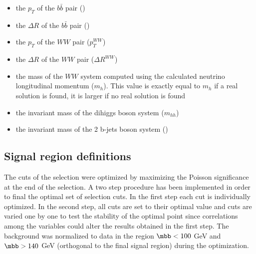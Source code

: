 \begin{itemize}
\item the $p_T$ of the $b \bar{b}$ pair (\ptbb)
\item the $\Delta R$ of the $b \bar{b}$ pair (\drbb)
\item the $p_T$ of the $WW$ pair ($p_T^{WW}$)
\item the $\Delta R$ of the $WW$ pair ($\Delta R^{WW}$)
\item the mass of the $WW$ system computed using the calculated neutrino longitudinal momentum ($m_{h}$). This value is exactly equal to $m_h$ if a real solution is found, it is larger if no real solution is found
\item the invariant mass of the dihiggs boson system ($m_{hh}$) 
\item the invariant mass of the 2 b-jets boson system (\mbb) 
\end{itemize}

\subsection{Signal region definitions}
\label{subsec:SR}
The cuts of the selection were optimized by maximizing the Poisson significance at the end of the selection. A two step procedure has been implemented in order to final the optimal set of selection cuts. In the first step each cut is individually optimized. In the second step, all cuts are set to their optimal value and cuts are varied one by one to test the stability of the optimal point since correlations among the variables could alter the results obtained in the first step. %
The \ttbar background was normalized to data in the region $\mbb < 100$ GeV and $\mbb > 140$ GeV (orthogonal to the final signal region) during the optimization. 

